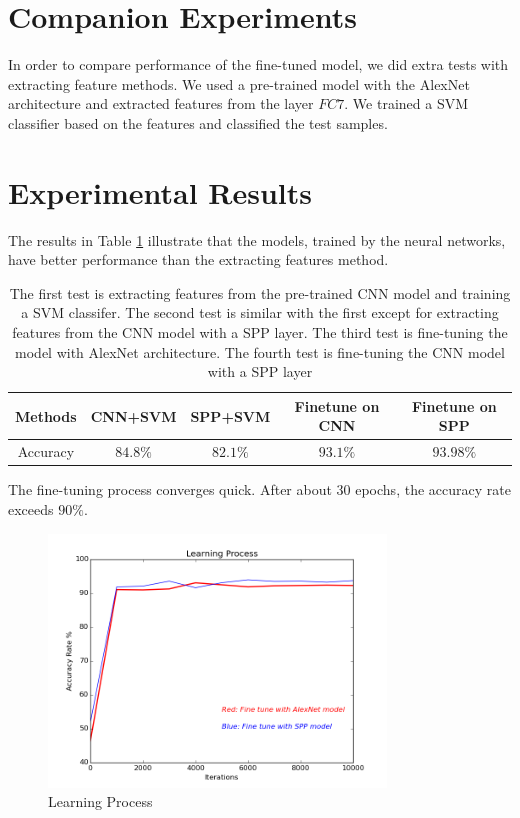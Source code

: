\section{Companion Experiments}

In order to compare performance of the fine-tuned model, we did extra tests with extracting feature methods. We used a pre-trained model with the AlexNet architecture and extracted features from the layer $FC7$. We trained a SVM classifier based on the features and classified the test samples.

\section{Experimental Results}

The results in Table \ref{ExpRes} illustrate that the models, trained by the neural networks, have better performance than the extracting features method. 

\begin{table}[h]
\begin{center}
    \begin{tabular}{| c | c | c | c | c |}
    \hline
    Methods & CNN+SVM & SPP+SVM & Finetune on CNN & Finetune on SPP  \\ \hline
    Accuracy & $84.8\%$ & $82.1\%$ & $93.1\%$ & $93.98\%$ \\ \hline
    \end{tabular}
    \caption{The first test is extracting features from the pre-trained CNN model and training a SVM classifer. The second test is similar with the first except for extracting features from the CNN model with a SPP layer. The third test is fine-tuning the model with AlexNet architecture. The fourth test is fine-tuning the CNN model with a SPP layer}
    \label{ExpRes}
\end{center}
\end{table}

The fine-tuning process converges quick. After about 30 epochs, the accuracy rate exceeds $90\%$. 
\graphicspath{ {./Figures/} }
\begin{figure}[!htb]
    \centering
	\includegraphics[width=0.8\textwidth]{FinetuneAccuracy.png}
    \caption{Learning Process}%
    \label{fig:finetuneprocess}%
\end{figure}

